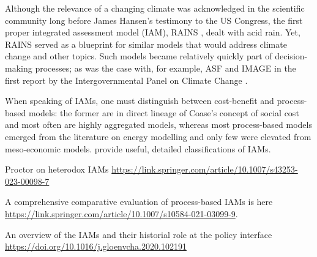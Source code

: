 \documentclass{article}
\begin{document}
\begin{refsection}
Although the relevance of a changing climate was acknowledged in the scientific community long before James Hansen's testimony to the US Congress, the first proper integrated assessment model (IAM), RAINS \parencite[developed during the 1980s; for an overview see][]{alcamo_1991}, dealt with acid rain. Yet, RAINS served as a blueprint for similar models that would address climate change and other topics. Such models became relatively quickly part of decision-making processes; as was the case with, for example, ASF \parencite{lashof_1989} and IMAGE \parencite{rotmans_1990} in the first report by the Intergovernmental Panel on Climate Change \parencite*[IPCC,][]{ipcc_1991}.

When speaking of IAMs, one must distinguish between cost-benefit and process-based models: the former are in direct lineage of Coase's concept of social cost and most often are highly aggregated models, whereas most process-based models emerged from the literature on energy modelling and only few were elevated from meso-economic models.\footnotemark{} \textcite{nikas2019,hafner2020} provide useful, detailed classifications of IAMs.

Proctor on heterodox IAMs \url{https://link.springer.com/article/10.1007/s43253-023-00098-7}

A comprehensive comparative evaluation of process-based IAMs is here \url{https://link.springer.com/article/10.1007/s10584-021-03099-9}.

An overview of the IAMs and their historial role at the policy interface \url{https://doi.org/10.1016/j.gloenvcha.2020.102191}



\end{refsection}
\end{document}
